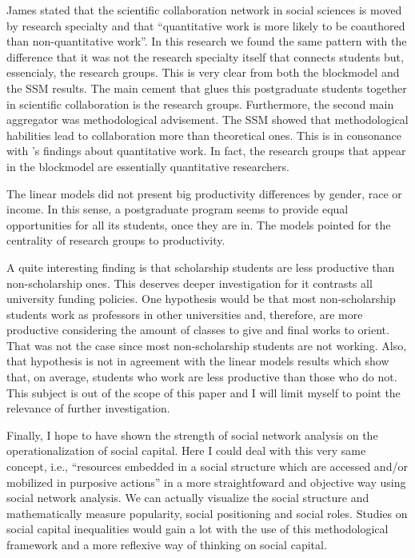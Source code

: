 \documentclass[12pt, english]{article}
\begin{document}
James \cite[p. 213]{moody2004structure} stated that the scientific collaboration network in social sciences is moved by research specialty and that ``quantitative work is more likely to be coauthored than non-quantitative work''. In this research we found the same pattern with the difference that it was not the research specialty itself that connects students but, essencialy, the research groups. This is very clear from both the blockmodel and the SSM results. The main cement that glues this postgraduate students together in scientific collaboration is the research groups. Furthermore, the second main aggregator was methodological advisement. The SSM showed that methodological habilities lead to collaboration more than theoretical ones. This is in consonance with \cite{moody2004structure}'s findings about quantitative work. In fact, the research groups that appear in the blockmodel are essentially quantitative researchers.

The linear models did not present big productivity differences by gender, race or income. In this sense, a postgraduate program seems to provide equal opportunities for all its students, once they are in. The models pointed for the centrality of research groups to productivity.

A quite interesting finding is that scholarship students are less productive than non-scholarship ones. This deserves deeper investigation for it contrasts all university funding policies. One hypothesis would be that most non-scholarship students work as professors in other universities and, therefore, are more productive considering the amount of classes to give and final works to orient. That was not the case since most non-scholarship students are not working. Also, that hypothesis is not in agreement with the linear models results which show that, on average, students who work are less productive than those who do not. This subject is out of the scope of this paper and I will limit myself to point the relevance of further investigation.

Finally, I hope to have shown the strength of social network analysis on the operationalization of social capital. Here I could deal with this very same concept, i.e., ``resources embedded in a social structure which are accessed and/or mobilized in purposive actions'' \cite[p. 35]{lin1999building} in a more straightfoward and objective way using social network analysis. We can actually visualize the social structure and mathematically measure popularity, social positioning and social roles. Studies on social capital inequalities would gain a lot with the use of this methodological framework and a more reflexive way of thinking on social capital.



\end{document}
